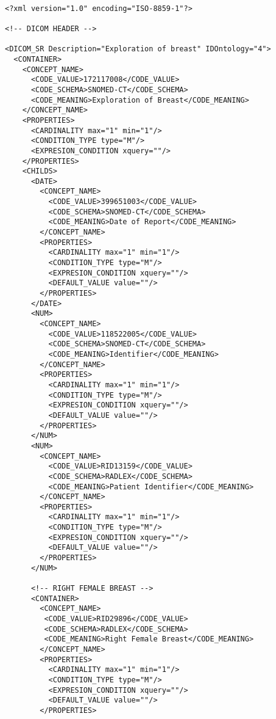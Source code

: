 \lstset{escapechar=@,style=dicom}
\renewcommand*\lstlistingname{Fichero}

\begin{lstlisting}[label=dicom-template,caption=Plantilla de un informe estructurado de una exploración de mama]

<?xml version="1.0" encoding="ISO-8859-1"?>

<!-- DICOM HEADER -->

<DICOM_SR Description="Exploration of breast" IDOntology="4">
  <CONTAINER>
    <CONCEPT_NAME>
      <CODE_VALUE>172117008</CODE_VALUE>
      <CODE_SCHEMA>SNOMED-CT</CODE_SCHEMA>
      <CODE_MEANING>Exploration of Breast</CODE_MEANING>
    </CONCEPT_NAME>
    <PROPERTIES>
      <CARDINALITY max="1" min="1"/>
      <CONDITION_TYPE type="M"/>
      <EXPRESION_CONDITION xquery=""/>
    </PROPERTIES>
    <CHILDS>
      <DATE>
        <CONCEPT_NAME>
          <CODE_VALUE>399651003</CODE_VALUE>
          <CODE_SCHEMA>SNOMED-CT</CODE_SCHEMA>
          <CODE_MEANING>Date of Report</CODE_MEANING>
        </CONCEPT_NAME>
        <PROPERTIES>
          <CARDINALITY max="1" min="1"/>
          <CONDITION_TYPE type="M"/>
          <EXPRESION_CONDITION xquery=""/>
          <DEFAULT_VALUE value=""/>
        </PROPERTIES>
      </DATE>
      <NUM>
        <CONCEPT_NAME>
          <CODE_VALUE>118522005</CODE_VALUE>
          <CODE_SCHEMA>SNOMED-CT</CODE_SCHEMA>
          <CODE_MEANING>Identifier</CODE_MEANING>
        </CONCEPT_NAME>
        <PROPERTIES>
          <CARDINALITY max="1" min="1"/>
          <CONDITION_TYPE type="M"/>
          <EXPRESION_CONDITION xquery=""/>
          <DEFAULT_VALUE value=""/>
        </PROPERTIES>
      </NUM>
      <NUM>
        <CONCEPT_NAME>
          <CODE_VALUE>RID13159</CODE_VALUE>
          <CODE_SCHEMA>RADLEX</CODE_SCHEMA>
          <CODE_MEANING>Patient Identifier</CODE_MEANING>
        </CONCEPT_NAME>
        <PROPERTIES>
          <CARDINALITY max="1" min="1"/>
          <CONDITION_TYPE type="M"/>
          <EXPRESION_CONDITION xquery=""/>
          <DEFAULT_VALUE value=""/>
        </PROPERTIES>
      </NUM>

      <!-- RIGHT FEMALE BREAST -->
      <CONTAINER>
        <CONCEPT_NAME>
         <CODE_VALUE>RID29896</CODE_VALUE>
         <CODE_SCHEMA>RADLEX</CODE_SCHEMA>
         <CODE_MEANING>Right Female Breast</CODE_MEANING>
        </CONCEPT_NAME>
        <PROPERTIES>
          <CARDINALITY max="1" min="1"/>
          <CONDITION_TYPE type="M"/>
          <EXPRESION_CONDITION xquery=""/>
          <DEFAULT_VALUE value=""/>
        </PROPERTIES>


\end{lstlisting}
